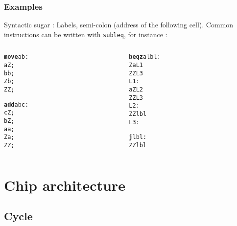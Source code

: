 \documentclass{beamer}
\begin{document}
\begin{frame}[fragile]
    \frametitle{Examples}
Syntactic sugar : Labels, semi-colon (address of the following cell).
Common instructions can be written with \texttt{subleq}, for instance :

\begin{columns}[t]
    \begin{column}[T]{3cm}
\begin{alltt}
{\bf move} a b :
   a Z ;
   b b ;
   Z b ;
   Z Z ;

{\bf add} a b c :
   c Z ;
   b Z ;
   a a ;
   Z a ;
   Z Z ;
\end{alltt}
    \end{column}
\begin{column}[T]{3cm}
\begin{alltt}
{\bf beqz} a lbl :
   	Z a L1
   	Z Z L3
 L1:
    a Z L2
    Z Z L3
 L2:
    Z Z lbl
 L3:

{\bf j} lbl :
    Z Z lbl
\end{alltt}
\end{column}
\end{columns}
\end{frame}

\section{Chip architecture}
\subsection{Cycle}
\end{document}
